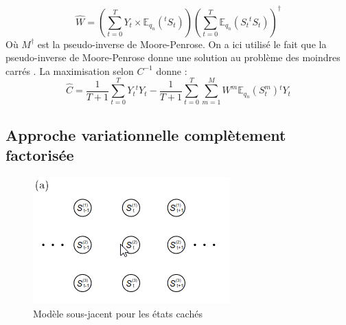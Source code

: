 \documentclass[10pt,a4paper]{article}
\begin{document}
\begin{equation}
  \widehat{W}=\left( \underset{t=0}{\overset{T}{\sum}} Y_t \times 
  \mathbb{E}_{q_n}({}^tS_t) \right) \left( \underset{t=0}{\overset{T}{\sum}} 
  \mathbb{E}_{q_n}\left( S_t {}^t S_t\right)\right)^{\dagger{}}
\end{equation}
Où $M^{\dagger{}}$ est la pseudo-inverse de Moore-Penrose. On a ici utilisé le fait que 
la pseudo-inverse de Moore-Penrose donne une solution au problème des moindres 
carrés \cite{ben2003generalized}. La maximisation selon $C^{-1}$ donne :
\begin{equation}
\widehat{C}=\frac{1}{T+1}\underset{t=0}{\overset{T}{\sum}}Y_t 
{}^tY_t-\frac{1}{T+1}\underset{t=0}{\overset{T}{\sum}}\underset{m=1}{\overset{M}
{\sum}}W^m\mathbb{E}_{q_n}(S_t^m){}^t Y_t
\end{equation}

\subsection{Approche variationnelle complètement factorisée}

\begin{figure}[H]
\centering
\includegraphics[scale=0.5]{../resources/pictures/complete_factorized.png}
\caption{Modèle sous-jacent pour les états cachés}
\end{figure}
\end{document}
